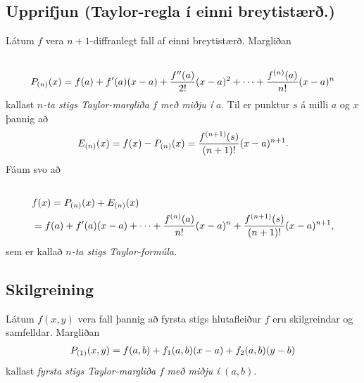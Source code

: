 \documentclass[a4paper,10pt,icelandic]{sphinxmanual}
\begin{document}

\subsection{Upprifjun (Taylor-regla í einni breytistærð.)}
\label{Kafli2:upprifjun-taylor-regla-i-einni-breytistaer}\label{Kafli2:index-30}
Látum \(f\) vera \(n+1\)-diffranlegt fall af einni breytistærð.
Margliðan
\begin{gather}
\begin{split}\displaystyle\end{split}\notag\\\begin{split}P_{(n)}(x)=f(a)+f'(a)(x-a)+\frac{f''(a)}{2!}(x-a)^2
+\cdots+\frac{f^{(n)}(a)}{n!}(x-a)^n\end{split}\notag
\end{gather}
kallast \(n\)\emph{-ta stigs Taylor-margliða} \(f\) \emph{með miðju í}
\(a\). Til er punktur \(s\) á milli \(a\) og \(x\)
þannig að
\begin{gather}
\begin{split}\displaystyle E_{(n)}(x)=f(x)-P_{(n)}(x)=\frac{f^{(n+1)}(s)}{(n+1)!}(x-a)^{n+1}.\end{split}\notag
\end{gather}
Fáum svo að
\begin{gather}
\begin{split}\displaystyle\end{split}\notag\\\begin{split}\begin{aligned}
&f(x)=P_{(n)}(x)+E_{(n)}(x) \\
&=f(a)+f'(a)(x-a)+\cdots+\frac{f^{(n)}(a)}{n!}(x-a)^n
+\frac{f^{(n+1)}(s)}{(n+1)!}(x-a)^{n+1}, \end{aligned}\end{split}\notag
\end{gather}
sem er kallað \(n\)\emph{-ta stigs Taylor-formúla.}


\subsection{Skilgreining}
\label{Kafli2:id56}\label{Kafli2:index-31}
Látum \(f(x,y)\) vera fall þannig að fyrsta stigs hlutafleiður
\(f\) eru skilgreindar og samfelldar. Margliðan
\begin{gather}
\begin{split}\displaystyle P_{(1)}(x,y)=f(a,b)+f_1(a,b)(x-a)+f_2(a,b)(y-b)\end{split}\notag
\end{gather}
kallast \emph{fyrsta stigs Taylor-margliða} \(f\) \emph{með miðju í}
\((a,b)\).
\end{document}
